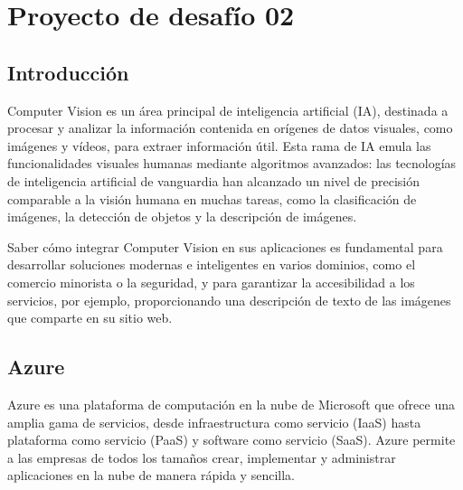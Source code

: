 \section{Proyecto de desafío 02}


\subsection{Introducción}

Computer Vision es un área principal de inteligencia artificial (IA), destinada a procesar y analizar 
la información contenida en orígenes de datos visuales, como imágenes y vídeos, para extraer información 
útil. Esta rama de IA emula las funcionalidades visuales humanas mediante algoritmos avanzados: las 
tecnologías de inteligencia artificial de vanguardia han alcanzado un nivel de precisión comparable a la 
visión humana en muchas tareas, como la clasificación de imágenes, la detección de objetos y la descripción de imágenes.

Saber cómo integrar Computer Vision en sus aplicaciones es fundamental para desarrollar soluciones modernas 
e inteligentes en varios dominios, como el comercio minorista o la seguridad, y para garantizar la accesibilidad a 
los servicios, por ejemplo, proporcionando una descripción de texto de las imágenes que comparte en su sitio web.

\subsection{Azure}

Azure es una plataforma de computación en la nube de Microsoft que ofrece una amplia gama de servicios, desde 
infraestructura como servicio (IaaS) hasta plataforma como servicio (PaaS) y software como servicio (SaaS). 
Azure permite a las empresas de todos los tamaños crear, implementar y administrar aplicaciones en la nube de 
manera rápida y sencilla.

